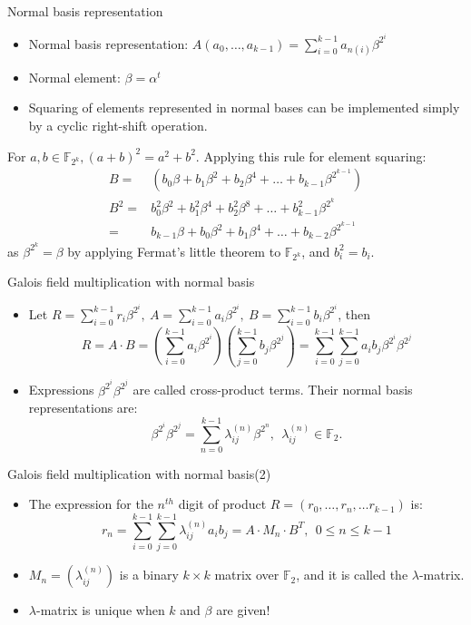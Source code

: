 \documentclass[xcolor=dvipsnames]{beamer}
\newcommand{\Fkk}{{\mathbb{F}}_{2^k}}
\newcommand{\bi}{\begin{itemize}}
\newcommand{\ei}{\end{itemize}}
\begin{document}
\begin{frame}{\large{Normal basis representation}}
\bi
\item Normal basis representation: $A(a_0,\dots,a_{k-1}) = \sum_{i=0}^{k-1}a_{n(i)}\beta^{2^i}$
\item Normal element: $\beta = \alpha^t$
\item Squaring of elements represented in
normal bases can be implemented simply by a cyclic right-shift
operation.
\ei
\begin{Example}
\label{ex:nb_sq}
For $a, b \in \Fkk, (a+b)^2 = a^2 + b^2$. Applying this rule for
element squaring: 
\begin{align}
B = & (b_0\beta + b_1\beta^2 + b_2\beta^4 + \dots + b_{k-1}\beta^{2^{k-1}}) \nonumber\\
B^2 = &b_0^2\beta^2 + b_1^2\beta^4 + b_2^2\beta^8 + \dots + b_{k-1}^2\beta^{2^k} \nonumber\\
= &b_{k-1}\beta + b_0\beta^2 + b_1\beta^4 + \dots + b_{k-2}\beta^{2^{k-1}} \nonumber
\end{align}
as $\beta^{2^k} = \beta$ by applying Fermat's little theorem to $\Fkk$, and $b_i^2 = b_i$. 
\end{Example}
\end{frame}
\begin{frame}{\large{Galois field multiplication with normal basis}}
\bi
\item Let $R =
\sum_{i=0}^{k-1} r_i \beta^{2^{i}}, ~A = \sum_{i=0}^{k-1} a_i
\beta^{2^{i}}, ~B = \sum_{i=0}^{k-1} b_i \beta^{2^{i}}$, then 
\[
R = A\cdot B = (\sum_{i=0}^{k-1} a_i \beta^{2^{i}}) (\sum_{j=0}^{k-1}
b_j \beta^{2^{j}})  =
\sum_{i=0}^{k-1}\sum_{j=0}^{k-1}a_ib_j\beta^{2^i}\beta^{2^j}\nonumber 
\]

\item Expressions $\beta^{2^i}\beta^{2^j}$ are called cross-product
terms. Their normal basis representations are: 
\begin{displaymath}
\beta^{2^i}\beta^{2^j} =
\sum_{n=0}^{k-1}\lambda_{ij}^{(n)}\beta^{2^n}, \ \ \lambda_{ij}^{(n)}
\in \mathbb F_2. 
\end{displaymath}
\ei
\end{frame}
\begin{frame}{\large{Galois field multiplication with normal basis(2)}}
\bi
\item The expression for the
$n^{th}$ digit of product $R = (r_0, \dots, r_n, \dots r_{k-1})$ is:
\[
r_n = \sum_{i=0}^{k-1}\sum_{j=0}^{k-1}\lambda_{ij}^{(n)}a_ib_j = A
\cdot M_n \cdot B^T, ~~0 \leq n \leq k-1
\]
\item $M_n = (\lambda_{ij}^{(n)})$ is a binary $k \times k$ matrix over
$\mathbb F_2$, and it is called the $\lambda$-matrix. 
\item $\lambda$-matrix is \alert{unique} when $k$ and $\beta$ are given!
\ei
\end{frame}
\end{document}
